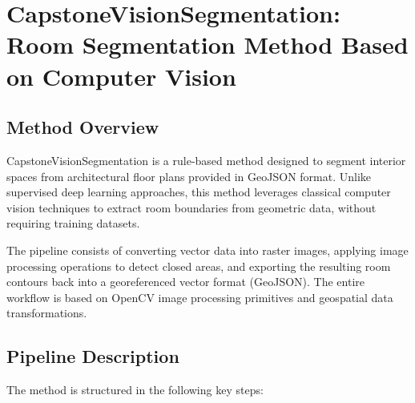 \documentclass{article}
\begin{document}
\section{CapstoneVisionSegmentation: Room Segmentation Method Based on Computer Vision}
\subsection{Method Overview}
CapstoneVisionSegmentation is a rule-based method designed to segment interior spaces from architectural floor plans provided in GeoJSON format. Unlike supervised deep learning approaches, this method leverages classical computer vision techniques to extract room boundaries from geometric data, without requiring training datasets.

The pipeline consists of converting vector data into raster images, applying image processing operations to detect closed areas, and exporting the resulting room contours back into a georeferenced vector format (GeoJSON). The entire workflow is based on OpenCV image processing primitives and geospatial data transformations.

\subsection{Pipeline Description}

The method is structured in the following key steps:
\end{document}
